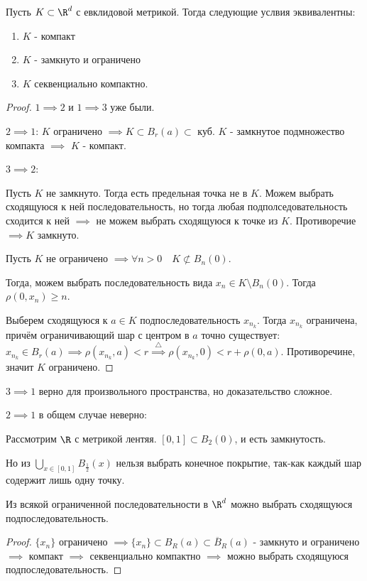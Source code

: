 \begin{theorem} \thmslashn

    Пусть $K \subset \R^{d}$ с евклидовой метрикой. Тогда следующие услвия эквивалентны:
    \begin{enumerate}
        \item $K$ - компакт
        \item $K$ - замкнуто и ограничено
        \item $K$ секвенциально компактно.
    \end{enumerate}
    \begin{proof} \thmslashn
    
        $1 \implies 2$ и $1 \implies 3$ уже были.

        $2 \implies 1$: $K$ ограничено $\implies K \subset B_{r}(a) \subset $ куб. $K$ - замкнутое подмножество компакта $\implies$ $K$ - компакт.

        $3 \implies 2$:

        Пусть $K$ не замкнуто. Тогда есть предельная точка не в $K$. Можем выбрать сходящуюся к ней последовательность, но тогда любая подполседовательность сходится к ней $\implies$ не можем выбрать сходящуюся к точке из $K$. Противоречие $\implies K$ замкнуто.

        Пусть $K$ не ограничено $\implies \forall{n > 0}\quad K \not \subset B_{n}(0)$.

        Тогда, можем выбрать последовательность вида $x_{n}\in K \setminus B_{n}(0)$. Тогда $\rho(0, x_{n}) \ge n$.

        Выберем сходящуюся к $a\in K$ подпоследовательность $x_{n_{k}}$. Тогда $x_{n_{k}}$ ограничена, причём ограничивающий шар с центром в $a$ точно существует: $x_{n_{k}}\in B_{r}(a) \implies \rho(x_{n_{k}}, a) < r \overset{\triangle}{\implies} \rho(x_{n_{k}}, 0) < r + \rho(0, a)$. Противоречине, значит $K$ ограничено.
    \end{proof}
\end{theorem}
\begin{remark} \thmslashn

    $3 \implies 1$ верно для произвольного пространства, но доказательство сложное.

    $2 \implies 1$ в общем случае неверно:

    Рассмотрим $\R$ с метрикой лентяя. $[0, 1] \subset B_{2}(0)$, и есть замкнутость.

    Но из $\bigcup_{x\in [0, 1]} B_{\frac{1}{2}}(x)$ нельзя выбрать конечное покрытие, так-как каждый шар содержит лишь одну точку.
\end{remark}
\begin{theorem} \thmslashn

    Из всякой ограниченной последовательности в $\R^{d}$ можно выбрать сходящуюся подпоследовательность.
    \begin{proof} \thmslashn
    
        $\{x_{n}\}$ ограничено $\implies \{x_{n}\} \subset B_{R}(a) \subset \overline{B}_{R}(a) $ - замкнуто и ограничено $\implies$ компакт $\implies$ секвенциально компактно $\implies$ можно выбрать сходящуюся подпоследовательность.
    \end{proof}
\end{theorem}
